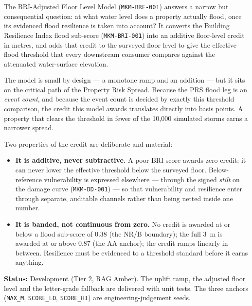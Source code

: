 \documentclass[11pt,a4paper]{article}
\begin{document}
\mkmtitlepage
\mkmlegalpage
\tableofcontents
\clearpage

\mkmexecsummary

The BRI-Adjusted Floor Level Model (\texttt{MKM-BRF-001}) answers a narrow but
consequential question: at what water level does a property actually flood, once
its evidenced flood resilience is taken into account? It converts the Building
Resilience Index flood sub-score (\texttt{MKM-BRI-001}) into an additive
floor-level credit in metres, and adds that credit to the surveyed floor level
to give the effective flood threshold that every downstream consumer compares
against the attenuated water-surface elevation.

The model is small by design --- a monotone ramp and an addition --- but it sits
on the critical path of the Property Risk Spread. Because the PRS flood leg is
an \emph{event count}, and because the event count is decided by exactly this
threshold comparison, the credit this model awards translates directly into
basis points. A property that clears the threshold in fewer of the 10{,}000
simulated storms earns a narrower spread.

Two properties of the credit are deliberate and material:

\begin{itemize}
  \item \textbf{It is additive, never subtractive.} A poor BRI score awards zero
        credit; it can never lower the effective threshold below the surveyed
        floor. Below-reference vulnerability is expressed elsewhere --- through
        the signed \emph{stilt} on the damage curve (\texttt{MKM-DD-001}) ---
        so that vulnerability and resilience enter through separate, auditable
        channels rather than being netted inside one number.
  \item \textbf{It is banded, not continuous from zero.} No credit is awarded at
        or below a flood sub-score of 0.38 (the NR/B boundary); the full 3~m is
        awarded at or above 0.87 (the AA anchor); the credit ramps linearly in
        between. Resilience must be evidenced to a threshold standard before it
        earns anything.
\end{itemize}

\textbf{Status:} Development (Tier 2, RAG Amber). The uplift ramp, the adjusted
floor level and the letter-grade fallback are delivered with unit tests. The
three anchors (\texttt{MAX\_M}, \texttt{SCORE\_LO}, \texttt{SCORE\_HI}) are
engineering-judgement seeds.
\end{document}
